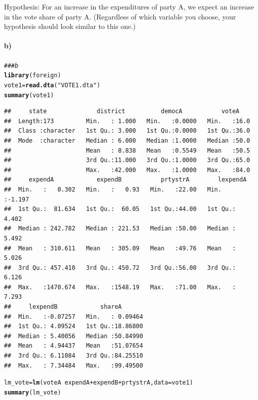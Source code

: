 \documentclass[12pt]{article}\usepackage[]{graphicx}\usepackage[]{color}
\makeatletter
\newcommand{\hlstr}[1]{\textcolor[rgb]{0.192,0.494,0.8}{#1}}%
\newcommand{\hlcom}[1]{\textcolor[rgb]{0.678,0.584,0.686}{\textit{#1}}}%
\newcommand{\hlopt}[1]{\textcolor[rgb]{0,0,0}{#1}}%
\newcommand{\hlstd}[1]{\textcolor[rgb]{0.345,0.345,0.345}{#1}}%
\newcommand{\hlkwb}[1]{\textcolor[rgb]{0.69,0.353,0.396}{#1}}%
\newcommand{\hlkwc}[1]{\textcolor[rgb]{0.333,0.667,0.333}{#1}}%
\newcommand{\hlkwd}[1]{\textcolor[rgb]{0.737,0.353,0.396}{\textbf{#1}}}%
\newenvironment{kframe}{%
 \def\at@end@of@kframe{}%
 \ifinner\ifhmode%
  \def\at@end@of@kframe{\end{minipage}}%
  \begin{minipage}{\columnwidth}%
 \fi\fi%
 \def\FrameCommand##1{\hskip\@totalleftmargin \hskip-\fboxsep
 \colorbox{shadecolor}{##1}\hskip-\fboxsep
     \hskip-\linewidth \hskip-\@totalleftmargin \hskip\columnwidth}%
 \MakeFramed {\advance\hsize-\width
   \@totalleftmargin\z@ \linewidth\hsize
   \@setminipage}}%
 {\par\unskip\endMakeFramed%
 \at@end@of@kframe}
\newenvironment{knitrout}{}{} %
\makeatother
\begin{document}
Hypothesis: For an increase in the expenditures of party A, we expect an increase in the vote share of party A. (Regardless of which variable you choose, your hypothesis should look similar to this one.)

\paragraph{b)} 

\begin{knitrout}
\color{fgcolor}\begin{kframe}
\begin{alltt}
\hlcom{### b}
\hlkwd{library}\hlstd{(foreign)}
\hlstd{vote1} \hlkwb{=} \hlkwd{read.dta}\hlstd{(}\hlstr{"VOTE1.dta"}\hlstd{)}
\hlkwd{summary}\hlstd{(vote1)}
\end{alltt}
\begin{verbatim}
##     state              district          democA           voteA     
##  Length:173         Min.   : 1.000   Min.   :0.0000   Min.   :16.0  
##  Class :character   1st Qu.: 3.000   1st Qu.:0.0000   1st Qu.:36.0  
##  Mode  :character   Median : 6.000   Median :1.0000   Median :50.0  
##                     Mean   : 8.838   Mean   :0.5549   Mean   :50.5  
##                     3rd Qu.:11.000   3rd Qu.:1.0000   3rd Qu.:65.0  
##                     Max.   :42.000   Max.   :1.0000   Max.   :84.0  
##     expendA            expendB           prtystrA        lexpendA     
##  Min.   :   0.302   Min.   :   0.93   Min.   :22.00   Min.   :-1.197  
##  1st Qu.:  81.634   1st Qu.:  60.05   1st Qu.:44.00   1st Qu.: 4.402  
##  Median : 242.782   Median : 221.53   Median :50.00   Median : 5.492  
##  Mean   : 310.611   Mean   : 305.09   Mean   :49.76   Mean   : 5.026  
##  3rd Qu.: 457.410   3rd Qu.: 450.72   3rd Qu.:56.00   3rd Qu.: 6.126  
##  Max.   :1470.674   Max.   :1548.19   Max.   :71.00   Max.   : 7.293  
##     lexpendB            shareA        
##  Min.   :-0.07257   Min.   : 0.09464  
##  1st Qu.: 4.09524   1st Qu.:18.86800  
##  Median : 5.40056   Median :50.84990  
##  Mean   : 4.94437   Mean   :51.07654  
##  3rd Qu.: 6.11084   3rd Qu.:84.25510  
##  Max.   : 7.34484   Max.   :99.49500
\end{verbatim}
\begin{alltt}
\hlstd{lm_vote} \hlkwb{=} \hlkwd{lm}\hlstd{(voteA} \hlopt{~} \hlstd{expendA} \hlopt{+} \hlstd{expendB} \hlopt{+} \hlstd{prtystrA,} \hlkwc{data} \hlstd{= vote1)}
\hlkwd{summary}\hlstd{(lm_vote)}
\end{alltt}

\end{kframe}
\end{knitrout}
\end{document}
